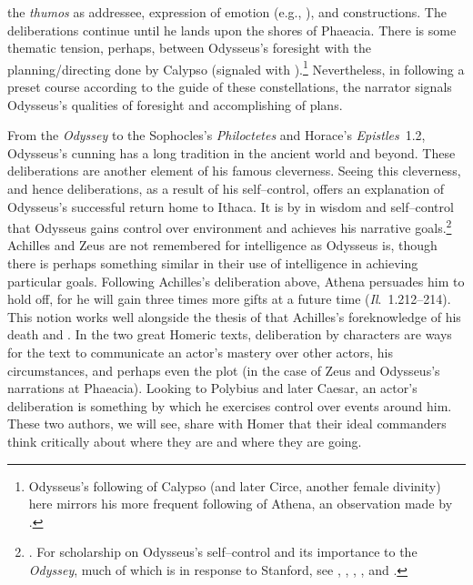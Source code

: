 \documentclass[12pt,letterpaper,oneside,final]{memoir}
\begin{document}
 the \emph{thumos} as addressee, expression of emotion (e.g., ), and  constructions. The deliberations continue until he lands upon the shores of Phaeacia. There is some thematic tension, perhaps, between Odysseus's foresight with the planning/directing done by Calypso (signaled with ).\footnote{Odysseus's following of Calypso (and later Circe, another female divinity) here mirrors his more frequent following of Athena, an observation made by \textcite{murnaghan1995}.} Nevertheless, in following a preset course according to the guide of these constellations, the narrator signals Odysseus's qualities of foresight and accomplishing of plans.

From the \emph{Odyssey} to the Sophocles's \emph{Philoctetes} and Horace's \emph{Epistles}~1.2, Odysseus's cunning has a long tradition in the ancient world and beyond. These deliberations are another element of his famous cleverness. Seeing this cleverness, and hence deliberations, as a result of his self--control, \textcite{stanford1963} offers an explanation of Odysseus's successful return home to Ithaca. It is by  in wisdom and self--control that Odysseus gains control over environment and achieves his narrative goals.\footnote{. For scholarship on Odysseus's self--control and its importance to the \emph{Odyssey}, much of which is in response to Stanford, see \textcite{rose1975}, \textcite{dobbs1987}, \textcite{most1989}, \textcite{glenn1998}, and \textcite{scodel2004}.} Achilles and Zeus are not remembered for intelligence as Odysseus is, though there is perhaps something similar in their use of intelligence in achieving particular goals. Following Achilles's deliberation above, Athena persuades him to hold off, for he will gain three times more gifts at a future time (\emph{Il}.~1.212--214). This notion works well alongside the thesis of \textcite{scully1984} that Achilles's foreknowledge of his death  and . In the two great Homeric texts, deliberation by characters are ways for the text to communicate an actor's mastery over other actors, his circumstances, and perhaps even the plot (in the case of Zeus and Odysseus's narrations at Phaeacia). Looking to Polybius and later Caesar, an actor's deliberation is something by which he exercises control over events around him. These two authors, we will see, share with Homer that their ideal commanders think critically about where they are and where they are going.
\end{document}
